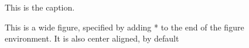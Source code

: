 \begin{figure}[]
    \noindent
    \caption{This is the caption. \label{egfig}}
\end{figure}

\begin{figure}[]
    \noindent
    \caption{This is a wide figure, specified by adding * to the end of
    the figure environment. It is also center
    aligned, by default}
\end{figure}

